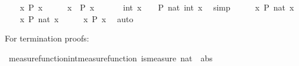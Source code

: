 \begin{isabellebody}
\isanewline
\ \ \isamarkupfalse%
\ {\isachardoublequoteopen}{\isasymexists}x{\isachardot}{\kern0pt}\ P\ x{\isachardoublequoteclose}\isanewline
\ \ \isamarkupfalse%
\ \isamarkupfalse%
\ x\ \ {\isachardoublequoteopen}P\ x{\isachardoublequoteclose}\ \isacommand{{\isachardot}{\kern0pt}{\isachardot}{\kern0pt}}\isamarkupfalse%
\isanewline
\ \ \isamarkupfalse%
\ \isamarkupfalse%
\ {\isachardoublequoteopen}int\ x\ {\isasymge}\ {}\ {\isasymand}\ P\ {\isacharparenleft}{\kern0pt}nat\ {\isacharparenleft}{\kern0pt}int\ x{\isacharparenright}{\kern0pt}{\isacharparenright}{\kern0pt}{\isachardoublequoteclose}\ \isamarkupfalse%
\ simp\isanewline
\ \ \isamarkupfalse%
\ \isamarkupfalse%
\ {\isachardoublequoteopen}{\isasymexists}x{\isasymge}{}{\isachardot}{\kern0pt}\ P\ {\isacharparenleft}{\kern0pt}nat\ x{\isacharparenright}{\kern0pt}{\isachardoublequoteclose}\ \isacommand{{\isachardot}{\kern0pt}{\isachardot}{\kern0pt}}\isamarkupfalse%
\isanewline
{}\isamarkupfalse%
\isanewline
\ \ \isamarkupfalse%
\ {\isachardoublequoteopen}{\isasymexists}x{\isasymge}{}{\isachardot}{\kern0pt}\ P\ {\isacharparenleft}{\kern0pt}nat\ x{\isacharparenright}{\kern0pt}{\isachardoublequoteclose}\isanewline
\ \ \isamarkupfalse%
\ \isamarkupfalse%
\ {\isachardoublequoteopen}{\isasymexists}x{\isachardot}{\kern0pt}\ P\ x{\isachardoublequoteclose}\ \isamarkupfalse%
\ auto\isanewline
{}\isamarkupfalse%
%
\endisatagproof
{\isafoldproof}%
%
\isadelimproof
%
\endisadelimproof
%
\begin{isamarkuptext}%
For termination proofs:%
\end{isamarkuptext}\isamarkuptrue%
\isamarkupfalse%
\ measure{\isacharunderscore}{\kern0pt}function{\isacharunderscore}{\kern0pt}int{\isacharbrackleft}{\kern0pt}measure{\isacharunderscore}{\kern0pt}function{\isacharbrackright}{\kern0pt}{\isacharcolon}{\kern0pt}\ {\isachardoublequoteopen}is{\isacharunderscore}{\kern0pt}measure\ {\isacharparenleft}{\kern0pt}nat\ {\isasymcirc}\ abs{\isacharparenright}{\kern0pt}{\isachardoublequoteclose}%
\isadelimproof
\ %
\endisadelimproof
%
\isatagproof
\isacommand{{\isachardot}{\kern0pt}{\isachardot}{\kern0pt}}\isamarkupfalse%
%
\endisatagproof
{\isafoldproof}%
%
\isadelimproof
%
\endisadelimproof
%
\isadelimdocument
%
\endisadelimdocument
%
\isatagdocument
%
\end{isabellebody}
